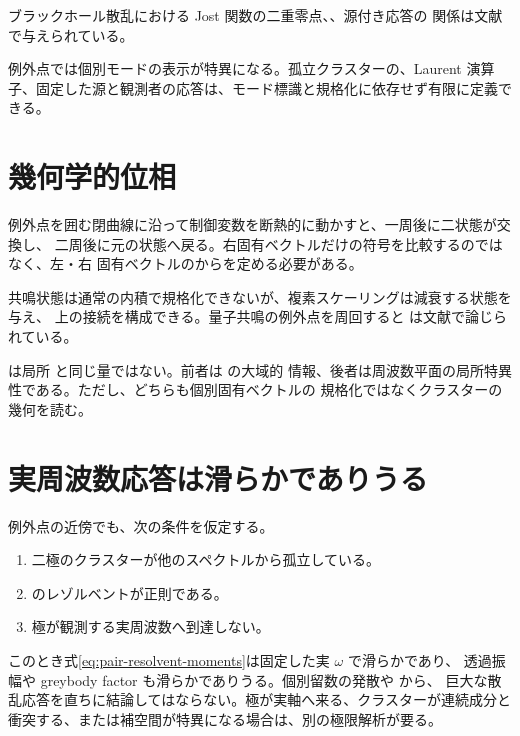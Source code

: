 ブラックホール散乱における Jost 関数の二重零点、、源付き応答の
関係は文献\cite{Morikawa:2026RieszLaurent}で与えられている。

\begin{principlebox}
例外点では個別モードの表示が特異になる。孤立クラスターの、Laurent
演算子、固定した源と観測者の応答は、モード標識と規格化に依存せず有限に定義できる。
\end{principlebox}

\section{幾何学的位相}

例外点を囲む閉曲線に沿って制御変数を断熱的に動かすと、一周後に二状態が交換し、
二周後に元の状態へ戻る。右固有ベクトルだけの符号を比較するのではなく、左・右
固有ベクトルのからを定める必要がある。

共鳴状態は通常の内積で規格化できないが、複素スケーリングは減衰する状態を与え、
上の接続を構成できる。量子共鳴の例外点を周回すると
は文献\cite{Morikawa:2025inx}で論じられている。

は局所 と同じ量ではない。前者は  の大域的
情報、後者は周波数平面の局所特異性である。ただし、どちらも個別固有ベクトルの
規格化ではなくクラスターの幾何を読む。

\section{実周波数応答は滑らかでありうる}

例外点の近傍でも、次の条件を仮定する。

\begin{enumerate}[label=(\roman*),leftmargin=2.8em]
\item 二極のクラスターが他のスペクトルから孤立している。
\item {}のレゾルベントが正則である。
\item 極が観測する実周波数へ到達しない。
\end{enumerate}

このとき式\eqref{eq:pair-resolvent-moments}は固定した実 $\omega$ で滑らかであり、
透過振幅や greybody factor も滑らかでありうる。個別留数の発散や  から、
巨大な散乱応答を直ちに結論してはならない。極が実軸へ来る、クラスターが連続成分と
衝突する、または補空間が特異になる場合は、別の極限解析が要る。


